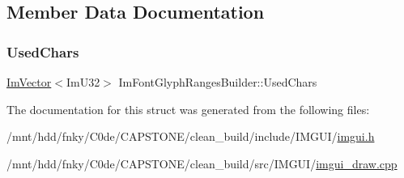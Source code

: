 \subsection{Member Data Documentation}
\mbox{\label{structImFontGlyphRangesBuilder_af83d63600e78e2454a78f0d736ba8ee4}} 
\subsubsection{\texorpdfstring{Used\+Chars}{UsedChars}}
{\footnotesize\ttfamily \hyperlink{structImVector}{Im\+Vector}$<$Im\+U32$>$ Im\+Font\+Glyph\+Ranges\+Builder\+::\+Used\+Chars}



The documentation for this struct was generated from the following files\+:\begin{DoxyCompactItemize}
\item 
/mnt/hdd/fnky/\+C0de/\+C\+A\+P\+S\+T\+O\+N\+E/clean\+\_\+build/include/\+I\+M\+G\+U\+I/\hyperlink{imgui_8h}{imgui.\+h}\item 
/mnt/hdd/fnky/\+C0de/\+C\+A\+P\+S\+T\+O\+N\+E/clean\+\_\+build/src/\+I\+M\+G\+U\+I/\hyperlink{imgui__draw_8cpp}{imgui\+\_\+draw.\+cpp}\end{DoxyCompactItemize}
